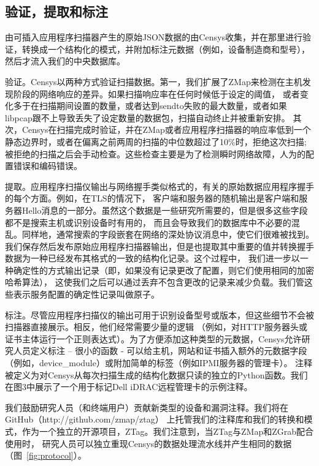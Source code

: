 \subsection{验证，提取和标注}

由可插入应用程序扫描器产生的原始JSON数据的由Censys收集，并在那里进行验证，转换成一个结构化的模式，并附加标注元数据（例如，设备制造商和型号），
然后才流入我们的中央数据库。

{\heiti 验证。}Censys以两种方式验证扫描数据。第一，我们扩展了ZMap来检测在主机发现阶段的网络响应的差异。如果扫描响应率在任何时候低于设定的阈值，
或者变化多于在扫描期间设置的数量，或者达到sendto失败的最大数量，或者如果libpcap跟不上导致丢失了设定数量的数据包，扫描自动终止并被重新安排。
其次，Censys在扫描完成时验证，并在ZMap或者应用程序扫描器的响应率低到一个静态边界时，或者在偏离之前两周的扫描的中位数超过了10\%时，拒绝这次扫描;
 被拒绝的扫描之后会手动检查。这些检查主要是为了检测瞬时网络故障，人为的配置错误和编码错误。

{\heiti 提取。}应用程序扫描仪输出与网络握手类似格式的，有关的原始数据应用程序握手的每个方面。例如，在TLS的情况下，
客户端和服务器的随机输出是客户端和服务器Hello消息的一部分。虽然这个数据是一些研究所需要的，但是很多这些字段都不是搜索主机或识别设备时有用的，
而且会导致我们的数据库中不必要的混乱。同样地，通常搜索的字段嵌套在网络的深处协议消息中，使它们很难被找到。
我们保存然后发布原始应用程序扫描器输出，但是也提取其中重要的值并转换握手数据为一种已经发布其格式的一致的结构化记录。这个过程中，
我们进一步以一种确定性的方式输出记录（即，如果没有记录更改了配置，则它们使用相同的加密哈希算法），
这使我们之后可以通过丢弃不包含更改的记录来减少负载。我们管这些表示服务配置的确定性记录叫做原子。

{\heiti 标注。}尽管应用程序扫描仪的输出可用于识别设备型号或版本，但这些细节不会被扫描器直接展示。相反，他们经常需要少量的逻辑
（例如，对HTTP服务器头或证书主体运行一个正则表达式）。为了方便添加这种类型的元数据，Censys允许研究人员定义标注 – 很小的函数 - 
可以给主机，网站和证书插入额外的元数据字段（例如，device\_module）或附加简单的标签（例如IPMI服务器的管理卡）。
注释被定义为对Censys从每次扫描生成的结构化数据只读的独立的Python函数。我们在图3中展示了一个用于标记Dell iDRAC远程管理卡的示例注释。

我们鼓励研究人员（和终端用户）贡献新类型的设备和漏洞注释。我们将在GitHub（http://github.com/zmap/ztag）
上托管我们的注释库和我们的转换和模式，作为一个独立的开源项目，ZTag。我们注意到，当ZTag与ZMap和ZGrab配合使用时，
研究人员可以独立重现Censys的数据处理流水线并产生相同的数据（图~\ref{fig:protocol}）。

